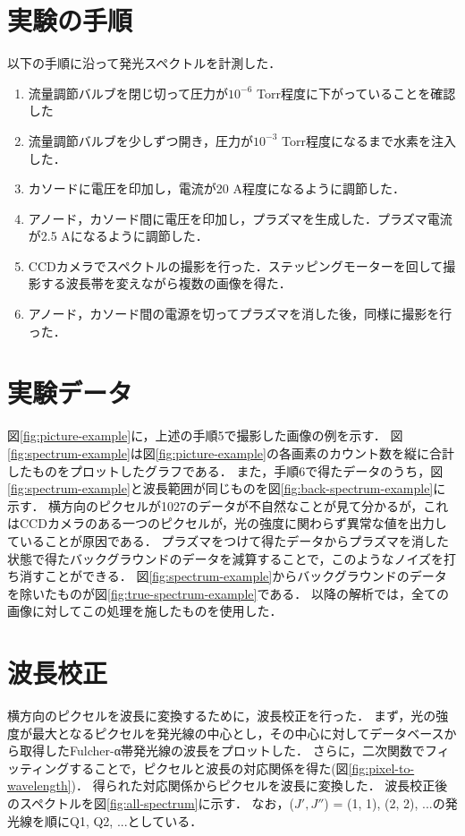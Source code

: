 \section{実験の手順}
以下の手順に沿って発光スペクトルを計測した．
\begin{enumerate}
    \item 流量調節バルブを閉じ切って圧力が$10^{-6}$ Torr程度に下がっていることを確認した
    \item 流量調節バルブを少しずつ開き，圧力が$10^{-3}$ Torr程度になるまで水素を注入した．
    \item カソードに電圧を印加し，電流が20 A程度になるように調節した．
    \item アノード，カソード間に電圧を印加し，プラズマを生成した．プラズマ電流が2.5 Aになるように調節した．
    \item CCDカメラでスペクトルの撮影を行った．ステッピングモーターを回して撮影する波長帯を変えながら複数の画像を得た．
    \item アノード，カソード間の電源を切ってプラズマを消した後，同様に撮影を行った．
\end{enumerate}

\section{実験データ}
図\ref{fig:picture-example}に，上述の手順5で撮影した画像の例を示す．
図\ref{fig:spectrum-example}は図\ref{fig:picture-example}の各画素のカウント数を縦に合計したものをプロットしたグラフである．
また，手順6で得たデータのうち，図\ref{fig:spectrum-example}と波長範囲が同じものを図\ref{fig:back-spectrum-example}に示す．
横方向のピクセルが1027のデータが不自然なことが見て分かるが，これはCCDカメラのある一つのピクセルが，光の強度に関わらず異常な値を出力していることが原因である．
プラズマをつけて得たデータからプラズマを消した状態で得たバックグラウンドのデータを減算することで，このようなノイズを打ち消すことができる．
図\ref{fig:spectrum-example}からバックグラウンドのデータを除いたものが図\ref{fig:true-spectrum-example}である．
以降の解析では，全ての画像に対してこの処理を施したものを使用した．

\section{波長校正}
横方向のピクセルを波長に変換するために，波長校正を行った．
まず，光の強度が最大となるピクセルを発光線の中心とし，その中心に対してデータベース\cite{H2-spectrum-data}から取得したFulcher-α帯発光線の波長をプロットした．
さらに，二次関数でフィッティングすることで，ピクセルと波長の対応関係を得た(図\ref{fig:pixel-to-wavelength})．
得られた対応関係からピクセルを波長に変換した．
波長校正後のスペクトルを図\ref{fig:all-spectrum}に示す．
なお，($J', J''$) = (1, 1), (2, 2), ...の発光線を順にQ1, Q2, ...としている．